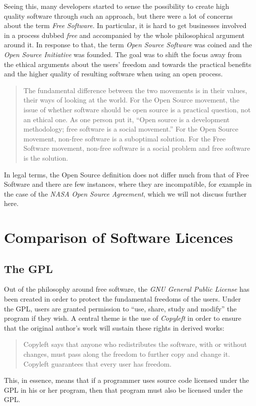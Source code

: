 \documentclass{article}
\begin{document}
Seeing this, many developers started to sense the possibility to
create high quality software through such an approach, but there
were a lot of concerns about the term \emph{Free Software}. In
particular, it is hard to get businesses involved in a process
dubbed \emph{free} and accompanied by the whole philosophical
argument around it. In response to that, the term
\emph{Open Source Software} was coined and the
\emph{Open Source Initiative} was founded. The goal was to shift
the focus away from the ethical arguments about the users' freedom
and towards the 
practical benefits and the higher quality of resulting software
when using an open process.
\begin{quote}
The fundamental difference between the two movements is in their
values, their ways of looking at the world. For the Open Source
movement, the issue of whether software should be open source
is a practical question, not an ethical one. As one person put it,
``Open source is a development methodology; free software is a social
movement.'' For the Open Source movement, non-free software is a
suboptimal solution. For the Free Software movement, non-free
software is a social problem and free software is the solution.
\end{quote}
In legal terms, the Open Source
definition does not differ much from that of Free Software and there
are few instances, where they are incompatible, for example in the
case of the \emph{NASA Open Source Agreement}, which we will not
discuss further here.
\section{Comparison of Software Licences}
\subsection{The GPL}
Out of the philosophy around free software, the 
\emph{GNU General Public License} has been
created in order to protect the fundamental freedoms of the users.
Under the GPL, users are granted permission to 
``use, share, study and modify'' the program if they wish.
A central theme is the use of \emph{Copyleft} in order to ensure
that the original author's work will sustain these rights in
derived works:
\begin{quote}
Copyleft says that anyone who redistributes the software,
with or without changes, must pass along the freedom to further
copy and change it. Copyleft guarantees that every user has freedom.
\end{quote}
This, in essence, means that if a programmer uses source code
licensed under the GPL in his or her program, then that program
must also be licensed under the GPL.
\end{document}
